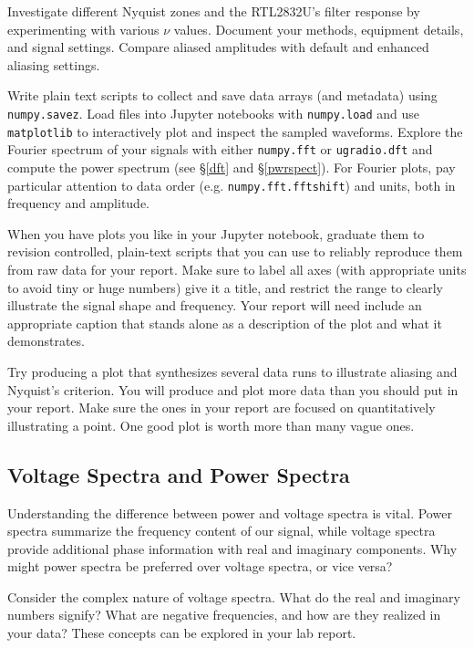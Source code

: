\documentclass[11pt,preprint]{aastex}
\begin{document}
Investigate different Nyquist zones and the RTL2832U's filter response by experimenting with various $\nu$ values. Document your methods, equipment details, and signal settings. Compare aliased amplitudes with default and enhanced aliasing settings.

Write plain text scripts to collect and save data arrays (and metadata) using {\tt numpy.savez}. Load files into Jupyter notebooks with {\tt numpy.load} and use {\tt matplotlib} to interactively plot and inspect the sampled waveforms. 
Explore the Fourier spectrum of your signals with either {\tt numpy.fft} or {\tt ugradio.dft} and compute the power spectrum (see \S\ref{dft} and \S\ref{pwrspect}).
For Fourier plots, pay particular attention to data order (e.g. {\tt numpy.fft.fftshift}) and units, both in frequency and amplitude.

When you have plots you like in your Jupyter notebook, graduate them to revision controlled, plain-text scripts that you can use to reliably reproduce them from raw data for your report.
Make sure to label all axes (with appropriate units to avoid tiny or huge numbers)
give it a title, and restrict the range to clearly illustrate
the signal shape and frequency.
Your report will need include an appropriate caption that
stands alone as a description of the plot and what it demonstrates.

Try producing a plot that synthesizes several data runs to illustrate aliasing and Nyquist's criterion.
You will produce and plot more data than you should put in your report.
Make sure the ones in your report are focused on quantitatively illustrating a point.
One good plot is worth more than many vague ones.


\subsection{Voltage Spectra and Power Spectra}

\noindent
Understanding the difference between power and voltage spectra is vital.
Power spectra summarize the frequency content of our signal, while voltage spectra provide additional phase information with real and imaginary components.
Why might power spectra be preferred over voltage spectra, or vice versa?

Consider the complex nature of voltage spectra. What do the real and imaginary numbers signify? What are negative frequencies, and how are they realized in your data? These concepts can be explored in your lab report.
\end{document}
